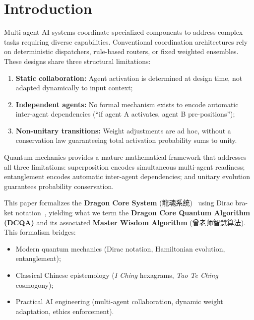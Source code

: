 \documentclass[conference]{IEEEtran}
\begin{document}
\section{Introduction}

Multi-agent AI systems coordinate specialized components
to address complex tasks requiring diverse capabilities.
Conventional coordination architectures rely on deterministic
dispatchers, rule-based routers, or fixed weighted ensembles.
These designs share three structural limitations:

\begin{enumerate}
  \item \textbf{Static collaboration:} Agent activation is
        determined at design time, not adapted dynamically
        to input context;
  \item \textbf{Independent agents:} No formal mechanism
        exists to encode automatic inter-agent dependencies
        (``if agent A activates, agent B pre-positions'');
  \item \textbf{Non-unitary transitions:} Weight adjustments
        are ad hoc, without a conservation law guaranteeing
        total activation probability sums to unity.
\end{enumerate}

Quantum mechanics provides a mature mathematical framework
that addresses all three limitations: superposition encodes
simultaneous multi-agent readiness; entanglement encodes
automatic inter-agent dependencies; and unitary evolution
guarantees probability conservation.

This paper formalizes the \textbf{Dragon Core System}
(龍魂系统)~\cite{cnsh2026framework} using Dirac bra-ket
notation~\cite{dirac1930principles}, yielding what we term
the \textbf{Dragon Core Quantum Algorithm (DCQA)} and its
associated \textbf{Master Wisdom Algorithm}
(曾老师智慧算法). This formalism bridges:

\begin{itemize}
  \item Modern quantum mechanics (Dirac notation,
        Hamiltonian evolution, entanglement);
  \item Classical Chinese epistemology (\textit{I Ching}
        hexagrams, \textit{Tao Te Ching} cosmogony);
  \item Practical AI engineering (multi-agent collaboration,
        dynamic weight adaptation, ethics enforcement).
\end{itemize}
\end{document}
